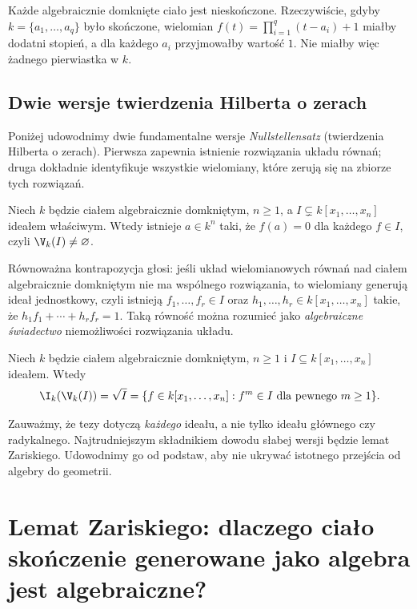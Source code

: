 \begin{uwaga}
Każde algebraicznie domknięte ciało jest nieskończone.
Rzeczywiście, gdyby $k=\{a_1,\dots,a_q\}$ było skończone,
wielomian $f(t)=\prod_{i=1}^q(t-a_i)+1$ miałby dodatni stopień,
a dla każdego $a_i$ przyjmowałby wartość $1$.
Nie miałby więc żadnego pierwiastka w $k$.
\end{uwaga}

\subsection{Dwie wersje twierdzenia Hilberta o zerach}

Poniżej udowodnimy dwie fundamentalne wersje
\emph{Nullstellensatz} (twierdzenia Hilberta o zerach).
Pierwsza zapewnia istnienie rozwiązania układu równań;
druga dokładnie identyfikuje wszystkie wielomiany, które
zerują się na zbiorze tych rozwiązań.

\begin{twierdzenie}
\label{tw:weak-NS}
Niech $k$ będzie ciałem algebraicznie domkniętym,
$n\ge1$, a $I\subsetneq k[x_1,\dots,x_n]$ ideałem właściwym.
Wtedy istnieje $a\in k^n$ taki, że $f(a)=0$ dla każdego $f\in I$,
czyli $\V_k(I)\ne\varnothing$.
\end{twierdzenie}

Równoważna kontrapozycja głosi: jeśli układ wielomianowych
równań nad ciałem algebraicznie domkniętym nie ma wspólnego
rozwiązania, to wielomiany generują ideał jednostkowy, czyli
istnieją $f_1,\dots,f_r\in I$ oraz
$h_1,\dots,h_r\in k[x_1,\dots,x_n]$ takie, że
$h_1f_1+\cdots+h_rf_r=1$.
Taką równość można rozumieć jako \emph{algebraiczne świadectwo}
niemożliwości rozwiązania układu.

\begin{twierdzenie}
\label{tw:strong-NS}
Niech $k$ będzie ciałem algebraicznie domkniętym,
$n\ge1$ i $I\subseteq k[x_1,\dots,x_n]$ ideałem.
Wtedy
\[
\I_k(\V_k(I))=\sqrt I
=\{f\in k[x_1,\dots,x_n]:f^m\in I\text{ dla pewnego }m\ge1\}.
\]
\end{twierdzenie}

Zauważmy, że tezy dotyczą \emph{każdego} ideału,
a nie tylko ideału głównego czy radykalnego. Najtrudniejszym
składnikiem dowodu słabej wersji będzie lemat Zariskiego.
Udowodnimy go od podstaw, aby nie ukrywać istotnego przejścia
od algebry do geometrii.

\section{Lemat Zariskiego: dlaczego ciało skończenie generowane jako algebra jest algebraiczne?}

